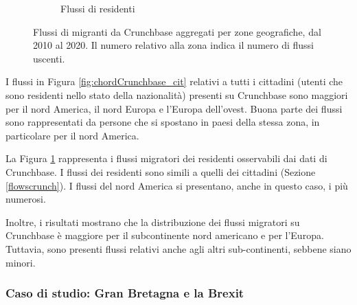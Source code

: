 \begin{figure}[tbp]
\begin{subfigure}{0.48\textwidth}
        \caption{Flussi di residenti}
        \label{fig:chordCrunchbase_res}
    \end{subfigure}
    \caption{Flussi di migranti da Crunchbase aggregati per zone geografiche, dal 2010 al 2020. Il numero relativo alla zona indica il numero di flussi uscenti.}
    \label{fig:chordCrunchbase}
\end{figure}

I flussi in Figura \ref{fig:chordCrunchbase_cit} relativi a tutti i cittadini (utenti che sono residenti nello stato della nazionalità) presenti su Crunchbase sono maggiori per il nord America, il nord Europa e l'Europa dell'ovest. 
Buona parte dei flussi sono rappresentati da persone che si spostano in paesi della stessa zona, in particolare per il nord America. \par

La Figura \ref{fig:chordCrunchbase_res} rappresenta i flussi migratori dei residenti osservabili dai dati di Crunchbase. 
I flussi dei residenti sono simili a quelli dei cittadini (Sezione \ref{flowscrunch}). I flussi del nord America si presentano, anche in questo caso, i più numerosi. 

Inoltre, i risultati mostrano che la distribuzione dei flussi migratori su Crunchbase è maggiore per il subcontinente nord americano e per l'Europa. Tuttavia, sono presenti flussi relativi anche agli altri sub-continenti, sebbene siano minori. 
\FloatBarrier

\subsubsection{Caso di studio: Gran Bretagna e la Brexit}
\label{brexitflowscrunch}


